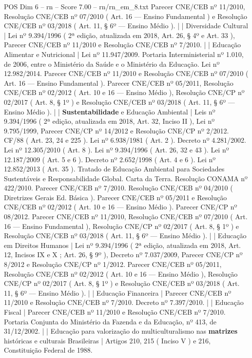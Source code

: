 \begin{textsample}{POS Dim 6 – rn – Score 7.00 – rn/rn\_em\_8.txt}
Parecer CNE/CEB nº 11/2010, Resolução CNE/CEB nº 07/2010 ( Art. 16 — Ensino Fundamental ) e Resolução CNE/CEB nº 03/2018 ( Art. 11, § 6º — Ensino Médio ). | | Diversidade Cultural | Lei nº 9.394/1996 ( 2ª edição, atualizada em 2018, Art. 26, § 4º e Art. 33 ), Parecer CNE/CEB nº 11/2010 e Resolução CNE/CEB nº 7/2010. | | Educação Alimentar e Nutricional | Lei nº 11.947/2009.
Portaria Interministerial nº 1.010, de 2006, entre o Ministério da Saúde e o Ministério da Educação.
Lei nº 12.982/2014.
Parecer CNE/CEB nº 11/2010 e Resolução CNE/CEB nº 07/2010 ( Art. 16 — Ensino Fundamental ).
Parecer CNE/CEB nº 05/2011, Resolução CNE/CEB nº 02/2012 ( Art. 10 e 16 — Ensino Médio ), Resolução CNE/CP nº 02/2017 ( Art. 8, § 1º ) e Resolução CNE/CEB nº 03/2018 ( Art. 11, § 6º — Ensino Médio ). | | \textbf{Sustentabilidade} e Educação Ambiental | Leis nº 9.394/1996 ( 2ª edição, atualizada em 2018, Art. 32, Inciso II ), Lei nº 9.795/1999, Parecer CNE/CP nº 14/2012 e Resolução CNE/CP nº 2/2012.
CF/88 ( Art. 23, 24 e 225 ).
Lei nº 6.938/1981 ( Art. 2 ).
Decreto nº 4.281/2002.
Lei nº 12.305/2010 ( Art. 8 ).
Lei nº 9.394/1996 ( Art. 26, 32 e 43 ).
Lei nº 12.187/2009 ( Art. 5 e 6 ).
Decreto nº 2.652/1998 ( Art. 4 e 6 ).
Lei nº 12.852/2013 ( Art. 35 ).
Tratado de Educação Ambiental para Sociedades Sustentáveis e Responsabilidade Global.
Carta da Terra.
Resolução CONAMA nº 422/2010.
Parecer CNE/CEB nº 7/2010.
Resolução CNE/CEB nº 04/2010 ( Diretrizes Gerais Ed.
Básica ).
Parecer CNE/CEB nº 05/2011 e Resolução CNE/CEB nº 02/2012 ( Art. 10 e 16 — Ensino Médio ).
Parecer CNE/CP nº 08/2012.
Parecer CNE/CEB nº 11/2010, Resolução CNE/CEB nº 07/2010 ( Art. 16 — Ensino Fundamental ), Resolução CNE/CP nº 02/2017 ( Art. 8, § 1º ) e Resolução CNE/CEB nº 03/2018 ( Art. 11, § 6º — Ensino Médio ). | | Educação em Direitos Humanos | Lei nº 9.394/1996 ( 2ª edição, atualizada em 2018, Art. 12, Incisos IX e X ; Art. 26, § 9º ), Decreto nº 7.037/2009, Parecer CNE/CP nº 8/2012 e Resolução CNE/CP nº 1/2012.
Parecer CNE/CEB nº 05/2011, Resolução CNE/CEB nº 02/2012 ( Art. 10 e 16 — Ensino Médio ), Resolução CNE/CP nº 02/2017 ( Art. 8, § 1º ) e Resolução CNE/CEB nº 03/2018 ( Art. 11, § 6º — Ensino Médio ). | | Educação Financeira | Parecer CNE/CEB nº 11/2010 e Resolução CNE/CEB nº 7/2010.
Decreto nº 7.397/2010. | | Educação Fiscal | Parecer CNE/CEB nº 11/2010 e Resolução CNE/CEB nº 7/2010.
Portaria Conjunta do Ministério da Fazenda e da Educação, nº 413, de 31/12/2002. | | Educação para valorização do multiculturalismo nas \textbf{matrizes} históricas e culturais Brasileiras | Artigos 210, 215 ( Inciso V ) e 216, Constituição Federal de 1988.

\end{textsample}

